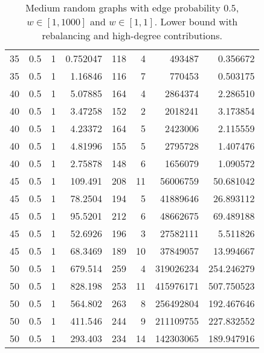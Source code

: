 \documentclass[a4paper,11pt]{article}
\begin{document}
\begin{table}
\begin{center}
\begin{tabular}{|rrr|r|r|rr|r|}
35 & 0.5 & 1 & 0.752047 & 118 & 4 & 493487 & 0.356672 \\
35 & 0.5 & 1 & 1.16846 & 116 & 7 & 770453 & 0.503175 \\
40 & 0.5 & 1 & 5.07885 & 164 & 4 & 2864374 & 2.286510 \\
40 & 0.5 & 1 & 3.47258 & 152 & 2 & 2018241 & 3.173854 \\
40 & 0.5 & 1 & 4.23372 & 164 & 5 & 2423006 & 2.115559 \\
40 & 0.5 & 1 & 4.81996 & 155 & 5 & 2795728 & 1.407476 \\
40 & 0.5 & 1 & 2.75878 & 148 & 6 & 1656079 & 1.090572 \\
45 & 0.5 & 1 & 109.491 & 208 & 11 & 56006759 & 50.681042 \\
45 & 0.5 & 1 & 78.2504 & 194 & 5 & 41889646 & 26.893112 \\
45 & 0.5 & 1 & 95.5201 & 212 & 6 & 48662675 & 69.489188 \\
45 & 0.5 & 1 & 52.6926 & 196 & 3 & 27582111 & 5.511826 \\
45 & 0.5 & 1 & 68.3469 & 189 & 10 & 37849057 & 13.994667 \\
50 & 0.5 & 1 & 679.514 & 259 & 4 & 319026234 & 254.246279 \\
50 & 0.5 & 1 & 828.198 & 253 & 11 & 415976171 & 507.750523 \\
50 & 0.5 & 1 & 564.802 & 263 & 8 & 256492804 & 192.467646 \\
50 & 0.5 & 1 & 411.546 & 244 & 9 & 211109755 & 227.832552 \\
50 & 0.5 & 1 & 293.403 & 234 & 14 & 142303065 & 189.947916 \\
\hline
\end{tabular}
\end{center}
\caption{Medium random graphs with edge probability $0.5$,
  $w\in[1,1000]$ and $w\in[1,1]$. Lower bound with rebalancing and
  high-degree contributions.}
\label{tab:medium-highdegree}
\end{table}
\end{document}
